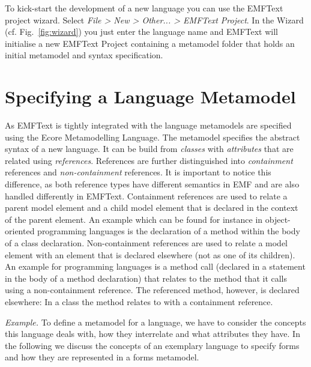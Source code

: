 	

	To kick-start the development of a new language you can use the EMFText project
	wizard. Select \emph{File > New > Other... > EMFText Project}. In the Wizard
	(cf. Fig.~\ref{fig:wizard}) you just enter the language name and EMFText
	will initialise a new EMFText Project containing a metamodel folder that
	holds an initial metamodel and syntax specification.

\section{Specifying a Language Metamodel}

	As EMFText is tightly integrated with the \EMF language metamodels are
	specified using the Ecore Metamodelling Language. The metamodel specifies the abstract
	syntax of a new language. It can be build from \emph{classes} with
	\emph{attributes} that are related using \emph{references}. References are
	further distinguished into \emph{containment} references and
	\emph{non-containment} references. It is important to notice this difference,
	as both reference types have different semantics in EMF and are also handled
	differently in EMFText. Containment references are used to relate a parent model element and a
	child model element that is declared in the context of the parent element. An
	example which can be found for instance in object-oriented programming
	languages is the declaration of a method within the body of a class declaration. Non-containment
	references are used to relate a model element with an element that is declared
	elsewhere (not as one of its children). An example for programming languages is
	a method call (declared in a statement in the body of a method declaration) that
	relates to the method that it calls using a non-containment reference. The
	referenced method, however, is declared elsewhere: In a class the method
	relates to with a containment reference. 

		\emph{Example.} 
		To define a metamodel for a language, we have to consider the
		concepts this language deals with, how they interrelate and what attributes they
		have. In the following we discuss the concepts of an exemplary language to
		specify forms and how they are represented in a forms metamodel.
		
